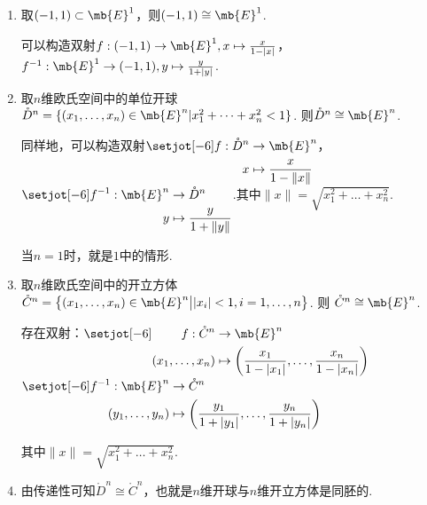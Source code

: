 \begin{instance}
    \begin{enumerate}
        \item 取$(-1,1)\subset \mb{E}^1$，则$(-1,1)\cong \mb{E}^1$.\par
        可以构造双射$f:(-1,1)\to\mb{E}^1, x\mapsto \frac{x}{1-|x|}$，$f^{-1}:\mb{E}^1\to(-1,1), y\mapsto \frac{y}{1+|y|}$.

        \item 取$n$维欧氏空间中的单位开球$\mathring{D}^n = \{(x_1,\dots,x_n)\in\mb{E}^n | x_1^2+\dots+x_n^2 < 1\}$. 则$\mathring{D}^n \cong \mb{E}^n$.\par
        同样地，可以构造双射$\setjot[-6]\begin{aligned}[t]
            f:\mathring{D}^n&\to\mb{E}^n \\
            x&\mapsto \frac{x}{1-\|x\|}
        \end{aligned}$，$\setjot[-6]\begin{aligned}[t]
            f^{-1}:\mb{E}^n&\to\mathring{D}^n \\ 
            y&\mapsto \frac{y}{1+\|y\|}
        \end{aligned}$.其中$\|x\|=\sqrt{x_1^2+\dots+x_n^2}$.\par
        当$n=1$时，就是$1$中的情形.
        \item 取$n$维欧氏空间中的开立方体$\mathring{C}^n = \big\{(x_1,\dots,x_n)\in\mb{E}^n \big| |x_i|<1, i=1,\dots,n\big\}$. 则 $\mathring{C}^n \cong \mb{E}^n$.\par
        存在双射：$\setjot[-6]\begin{aligned}[t]
            f:\mathring{C}^n&\to\mb{E}^n \\
            (x_1,\dots,x_n)&\mapsto \left(\frac{x_1}{1-|x_1|},\dots,\frac{x_n}{1-|x_n|}\right)
        \end{aligned}$\quad$\setjot[-6]\begin{aligned}[t]
            f^{-1}:\mb{E}^n&\to\mathring{C}^n \\
            (y_1,\dots,y_n)&\mapsto \left(\frac{y_1}{1+|y_1|},\dots,\frac{y_n}{1+|y_n|}\right)
        \end{aligned}$\par
        其中$\|x\|=\sqrt{x_1^2+\dots+x_n^2}$.\par
        \item 由传递性可知$\mathring{D}^n \cong \mathring{C}^n$，也就是$n$维开球与$n$维开立方体是同胚的.
    \end{enumerate}\par

\end{instance}

